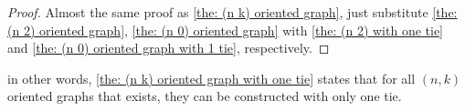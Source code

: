 \begin{proof}
  Almost the same proof as \cref{the: (n k) oriented graph},
  just substitute \cref{the: (n 2) oriented graph},
  \cref{the: (n 0) oriented graph} with
  \cref{the: (n 2) with one tie}
  and \cref{the: (n 0) oriented graph with 1 tie},
  respectively.
\end{proof}

in other words,
\cref{the: (n k) oriented graph with one tie}
states that for all \((n, k)\) oriented graphs
that exists, they can be constructed with only one tie.
